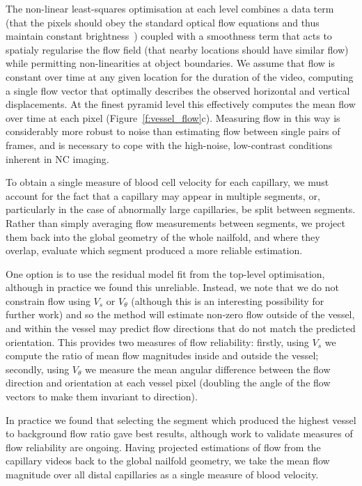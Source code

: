 \documentclass[runningheads,a4paper]{llncs}
\newcommand{\fref}[1]{Figure~\ref{#1}}
\newcommand{\sref}[1]{Section~\ref{#1}}
\def\eg{e.g.}
\begin{document}
The non-linear least-squares optimisation at each level combines a data term (that the pixels should obey the standard optical flow equations and thus maintain constant brightness~\cite{Horn_Schunk_AI81}) coupled with a smoothness term that acts to spatialy regularise the flow field (that nearby locations should have similar flow) while permitting non-linearities at object boundaries. We assume that flow is constant over time at any given location for the duration of the video, computing a single flow vector that optimally describes the observed horizontal and vertical displacements. At the finest pyramid level this effectively computes the mean flow over time at each pixel (\fref{f:vessel_flow}c). Measuring flow in this way is considerably more robust to noise than estimating flow between single pairs of frames, and is necessary to cope with the high-noise, low-contrast conditions inherent in NC imaging. 

To obtain a single measure of blood cell velocity for each capillary, we must account for the fact that a capillary may appear in multiple segments, or, particularly in the case of abnormally large capillaries, be split between segments. Rather than simply averaging flow measurements between segments, we project them back into the global geometry of the whole nailfold, and where they overlap, evaluate which segment produced a more reliable estimation. 

One option is to use the residual model fit from the top-level optimisation, although in practice we found this unreliable. Instead, we note that we do not constrain flow using $V_s$ or $V_\theta$ (although this is an interesting possibility for further work) and so the method will estimate non-zero flow outside of the vessel, and within the vessel may predict flow directions that do not match the predicted orientation. This provides two measures of flow reliability: firstly, using $V_s$ we compute the ratio of mean flow magnitudes inside and outside the vessel; secondly, using $V_\theta$ we measure the mean angular difference between the flow direction and orientation at each vessel pixel (doubling the angle of the flow vectors to make them invariant to direction).

In practice we found that selecting the segment which produced the highest vessel to background flow ratio gave best results, although work to validate measures of flow reliability are ongoing. Having projected estimations of flow from the capillary videos back to the global nailfold geometry, we take the mean flow magnitude over all distal capillaries as a single measure of blood velocity. %
%
\end{document}
